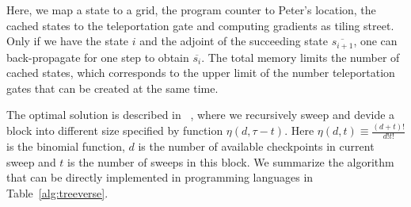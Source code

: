 \documentclass{article}
\theoremstyle{definition}
\begin{document}
Here, we map a state to a grid, the program counter to Peter's location, the cached states to the teleportation gate and computing gradients as tiling street.
Only if we have the state $i$ and the adjoint of the succeeding state $\overline{s_{i+1}}$, one can back-propagate for one step to obtain $\overline{s_i}$.
The total memory limits the number of cached states, which corresponds to the upper limit of the number teleportation gates that can be created at the same time.

The optimal solution is described in ~\cite{Griewank1992},
where we recursively sweep and devide a block into different size specified by function $\eta(d, \tau-t)$.
Here $\eta(d, t) \equiv \frac{(d+t)!}{d!t!}$ is the binomial function,
$d$ is the number of available checkpoints in current sweep and $t$ is the number of sweeps in this block.
We summarize the algorithm that can be directly implemented in programming languages in Table~\ref{alg:treeverse}.
\end{document}
